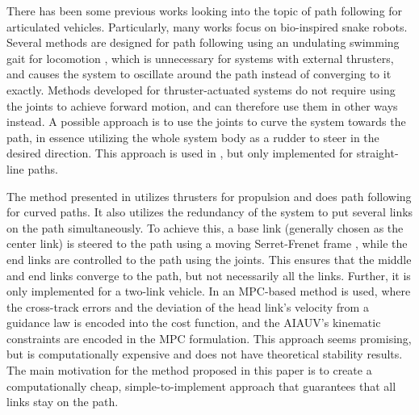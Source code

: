 \documentclass[../main.tex]{subfiles}
\begin{document}

There has been some previous works looking into the topic of path following for articulated vehicles. Particularly, many works focus on bio-inspired snake robots. Several methods are designed for path following using an undulating swimming gait for locomotion \cite{kelasidi2017,mohammadi2016}, which is unnecessary for systems with external thrusters, and causes the system to oscillate around the path instead of converging to it exactly. Methods developed for thruster-actuated systems do not require using the joints to achieve forward motion, and can therefore use them in other ways instead. A possible approach is to use the joints to curve the system towards the path, in essence utilizing the whole system body as a rudder to steer in the desired direction. This approach is used in \cite{wrzos-kaminska2019}, but only implemented for straight-line paths.

The method presented in \cite{engebretsen2019a} utilizes thrusters for propulsion and does path following for curved paths. It also utilizes the redundancy of the system to put several links on the path simultaneously. To achieve this, a base link (generally chosen as the center link) is steered to the path using a moving Serret-Frenet frame \citep{lapierre2007}, while the end links are controlled to the path using the joints. This ensures that the middle and end links converge to the path, but not necessarily all the links. Further, it is only implemented for a two-link vehicle. In \cite{gushkov2024} an MPC-based method is used, where the cross-track errors and the deviation of the head link's velocity from a guidance law is encoded into the cost function, and the AIAUV's kinematic constraints are encoded in the MPC formulation. This approach seems promising, but is computationally expensive and does not have theoretical stability results. The main motivation for the method proposed in this paper is to create a computationally cheap, simple-to-implement approach that guarantees that all links stay on the path.
\end{document}
